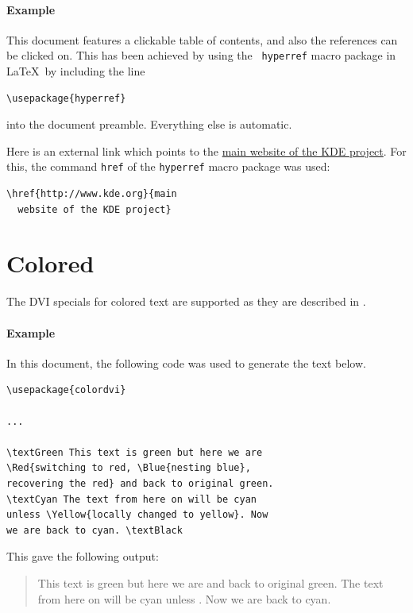 \documentclass{article}
\begin{document}
\paragraph*{Example}
This document features a clickable table of contents, and also the
references can be clicked on. This has been achieved by using the {\tt
  hyperref} macro package in \LaTeX\ by including the line
\begin{verbatim}
\usepackage{hyperref}
\end{verbatim}
into the document preamble. Everything else is automatic.

Here is an external link which points to the \href{http://www.kde.org}{main
  website of the KDE project}. For this, the command {\tt href} of the
{\tt hyperref} macro package was used:
\begin{verbatim}
\href{http://www.kde.org}{main
  website of the KDE project}
\end{verbatim}

\section{Colored   }

The DVI specials for colored text are supported as they are described
in \cite{dvips}. 

\paragraph*{Example} In this document, the following code was used to
generate the text below.
\begin{verbatim}
\usepackage{colordvi}

...

\textGreen This text is green but here we are
\Red{switching to red, \Blue{nesting blue}, 
recovering the red} and back to original green.
\textCyan The text from here on will be cyan 
unless \Yellow{locally changed to yellow}. Now
we are back to cyan. \textBlack
\end{verbatim}

This gave the following output:
\begin{verse}
 \textGreen This text is green but here
we are 
and back to original green.  \textCyan The text from here on will be
cyan unless . Now we are back to
cyan.  \textBlack
\end{verse}
\end{document}
